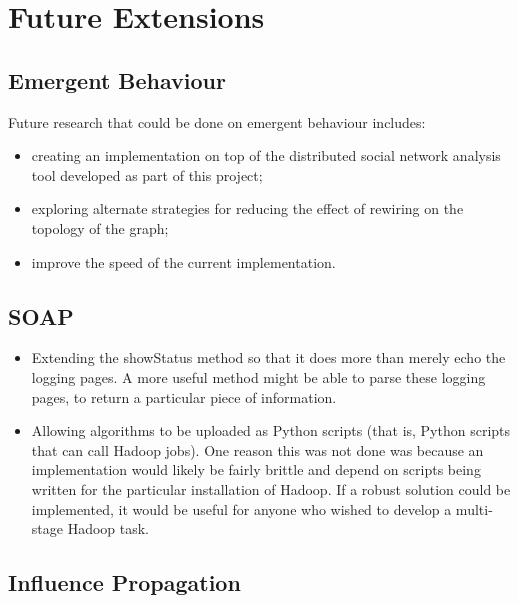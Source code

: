 \section{Future Extensions}

\subsection{Emergent Behaviour}

Future research that could be done on emergent behaviour includes:

\begin{itemize}
	\item creating an implementation on top of the distributed social network analysis tool developed as part of this project;
	\item exploring alternate strategies for reducing the effect of rewiring on the topology of the graph;
	\item improve the speed of the current implementation.
\end{itemize}

\subsection{SOAP}

\begin{itemize}
	\item Extending the showStatus method so that it does more than merely echo the logging pages. A more useful method might be able to parse these logging pages, to return a particular piece of information.
	\item Allowing algorithms to be uploaded as Python scripts (that is, Python scripts that can call Hadoop jobs). One reason this was not done was because an implementation would likely be fairly brittle and depend on scripts being written for the particular installation of Hadoop. If a robust solution could be implemented, it would be useful for anyone who wished to develop a multi-stage Hadoop task. 
\end{itemize}

\subsection{Influence Propagation}

